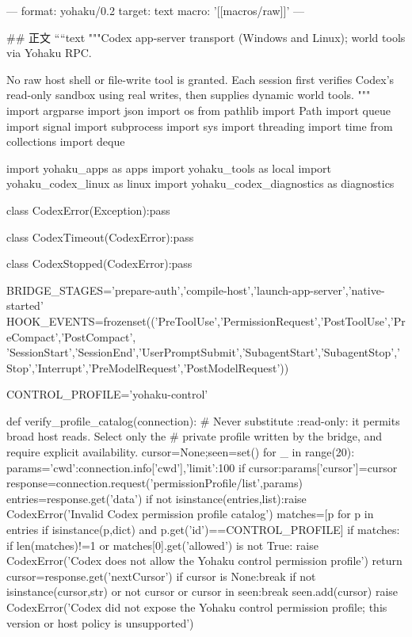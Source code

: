 ---
format: yohaku/0.2
target: text
macro: '[[macros/raw]]'
---

## 正文
````text
"""Codex app-server transport (Windows and Linux); world tools via Yohaku RPC.

No raw host shell or file-write tool is granted. Each session first verifies
Codex's read-only sandbox using real writes, then supplies dynamic world tools.
"""
import argparse
import json
import os
from pathlib import Path
import queue
import signal
import subprocess
import sys
import threading
import time
from collections import deque

import yohaku_apps as apps
import yohaku_tools as local
import yohaku_codex_linux as linux
import yohaku_codex_diagnostics as diagnostics

class CodexError(Exception):pass

class CodexTimeout(CodexError):pass

class CodexStopped(CodexError):pass

BRIDGE_STAGES={'prepare-auth','compile-host','launch-app-server','native-started'}
HOOK_EVENTS=frozenset(('PreToolUse','PermissionRequest','PostToolUse','PreCompact','PostCompact',
    'SessionStart','SessionEnd','UserPromptSubmit','SubagentStart','SubagentStop','Stop','Interrupt','PreModelRequest','PostModelRequest'))

CONTROL_PROFILE='yohaku-control'

def verify_profile_catalog(connection):
    # Never substitute :read-only: it permits broad host reads. Select only the
    # private profile written by the bridge, and require explicit availability.
    cursor=None;seen=set()
    for _ in range(20):
        params={'cwd':connection.info['cwd'],'limit':100}
        if cursor:params['cursor']=cursor
        response=connection.request('permissionProfile/list',params)
        entries=response.get('data')
        if not isinstance(entries,list):raise CodexError('Invalid Codex permission profile catalog')
        matches=[p for p in entries if isinstance(p,dict) and p.get('id')==CONTROL_PROFILE]
        if matches:
            if len(matches)!=1 or matches[0].get('allowed') is not True:
                raise CodexError('Codex does not allow the Yohaku control permission profile')
            return
        cursor=response.get('nextCursor')
        if cursor is None:break
        if not isinstance(cursor,str) or not cursor or cursor in seen:break
        seen.add(cursor)
    raise CodexError('Codex did not expose the Yohaku control permission profile; this version or host policy is unsupported')


